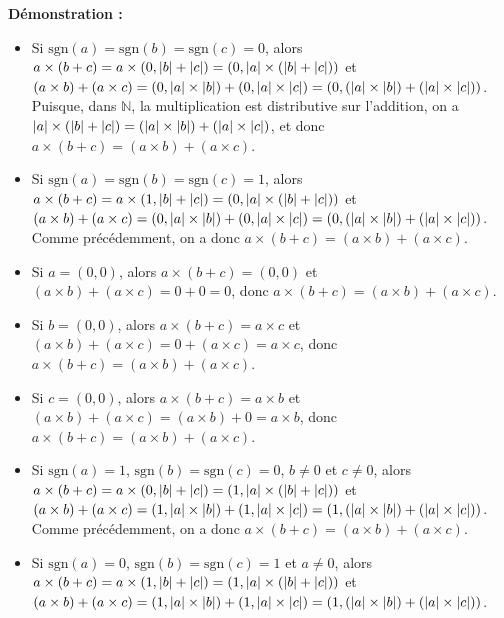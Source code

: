 \noindent\textbf{Démonstration :} 
\begin{itemize}[nosep]
    \item Si $\mathrm{sgn}(a) = \mathrm{sgn}(b) = \mathrm{sgn}(c) = 0$, alors $a \times (b + c) = a \times (0, \left\lvert b \right\rvert + \left\lvert c \right\rvert) = (0, \left\lvert a \right\rvert \times (\left\lvert b \right\rvert + \left\lvert c \right\rvert))$ et $(a \times b) + (a \times c) = (0, \left\lvert a \right\rvert \times \left\lvert b \right\rvert) + (0, \left\lvert a \right\rvert \times \left\lvert c \right\rvert) = (0, (\left\lvert a \right\rvert \times \left\lvert b \right\rvert) + (\left\lvert a \right\rvert \times \left\lvert c \right\rvert))$.
        Puisque, dans $\mathbb{N}$, la multiplication est distributive sur l'addition, on a $\left\lvert a \right\rvert \times (\left\lvert b \right\rvert + \left\lvert c \right\rvert) = (\left\lvert a \right\rvert \times \left\lvert b \right\rvert) + (\left\lvert a \right\rvert \times \left\lvert c \right\rvert)$, et donc $a \times (b + c) = (a \times b) + (a \times c)$.
    \item Si $\mathrm{sgn}(a) = \mathrm{sgn}(b) = \mathrm{sgn}(c) = 1$, alors $a \times (b + c) = a \times (1, \left\lvert b \right\rvert + \left\lvert c \right\rvert) = (0, \left\lvert a \right\rvert \times (\left\lvert b \right\rvert + \left\lvert c \right\rvert))$ et $(a \times b) + (a \times c) = (0, \left\lvert a \right\rvert \times \left\lvert b \right\rvert) + (0, \left\lvert a \right\rvert \times \left\lvert c \right\rvert) = (0, (\left\lvert a \right\rvert \times \left\lvert b \right\rvert) + (\left\lvert a \right\rvert \times \left\lvert c \right\rvert))$.
        Comme précédemment, on a donc $a \times (b + c) = (a \times b) + (a \times c)$.
    \item Si $a = (0,0)$, alors $a \times (b+c) = (0,0)$ et $(a \times b) + (a \times c) = 0 + 0 = 0$, donc $a \times (b + c) = (a \times b) + (a \times c)$.
    \item Si $b = (0,0)$, alors $a \times (b+c) = a \times c$ et $(a \times b) + (a \times c) = 0 + (a \times c) = a \times c$, donc $a \times (b + c) = (a \times b) + (a \times c)$.
    \item Si $c = (0,0)$, alors $a \times (b+c) = a \times b$ et $(a \times b) + (a \times c) = (a \times b) + 0 = a \times b$, donc $a \times (b + c) = (a \times b) + (a \times c)$.
    \item Si $\mathrm{sgn}(a) = 1$, $\mathrm{sgn}(b) = \mathrm{sgn}(c) = 0$, $b \neq 0$ et $c \neq 0$, alors $a \times (b + c) = a \times (0, \left\lvert b \right\rvert + \left\lvert c \right\rvert) = (1, \left\lvert a \right\rvert \times (\left\lvert b \right\rvert + \left\lvert c \right\rvert))$ et $(a \times b) + (a \times c) = (1, \left\lvert a \right\rvert \times \left\lvert b \right\rvert) + (1, \left\lvert a \right\rvert \times \left\lvert c \right\rvert) = (1, (\left\lvert a \right\rvert \times \left\lvert b \right\rvert) + (\left\lvert a \right\rvert \times \left\lvert c \right\rvert))$.
        Comme précédemment, on a donc $a \times (b + c) = (a \times b) + (a \times c)$.
    \item Si $\mathrm{sgn}(a) = 0$, $\mathrm{sgn}(b) = \mathrm{sgn}(c) = 1$ et $a \neq 0$, alors $a \times (b + c) = a \times (1, \left\lvert b \right\rvert + \left\lvert c \right\rvert) = (1, \left\lvert a \right\rvert \times (\left\lvert b \right\rvert + \left\lvert c \right\rvert))$ et $(a \times b) + (a \times c) = (1, \left\lvert a \right\rvert \times \left\lvert b \right\rvert) + (1, \left\lvert a \right\rvert \times \left\lvert c \right\rvert) = (1, (\left\lvert a \right\rvert \times \left\lvert b \right\rvert) + (\left\lvert a \right\rvert \times \left\lvert c \right\rvert))$.

\end{itemize}

